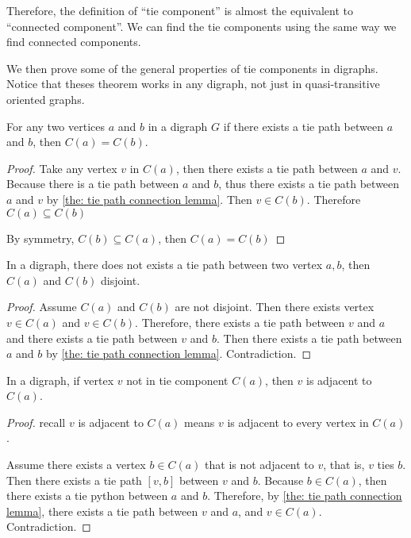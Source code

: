 Therefore, the definition of ``tie component''
is almost the equivalent to ``connected component''.
We can find the tie components using the same way
we find connected components.

We then prove some of the general properties of tie components
in digraphs.
Notice that theses theorem works in any digraph,
not just in quasi-transitive oriented graphs.

\begin{lemma}\label{the: component equal if tie path}
  For any two vertices \(a\) and \(b\) in a digraph \(G\)
  if there exists a tie path between \(a\) and \(b\),
  then \(C(a) = C(b)\).
\end{lemma}

\begin{proof}
  Take any vertex \(v\) in \(C(a)\),
  then there exists a tie path between \(a\) and \(v\).
  Because there is a tie path between \(a\) and \(b\),
  thus there exists a tie path between \(a\) and \(v\)
  by \cref{the: tie path connection lemma}.
  Then \(v \in C(b)\). Therefore \(C(a) \subseteq C(b)\)

  By symmetry, \(C(b) \subseteq C(a)\), then \(C(a) = C(b)\)
\end{proof}

\begin{lemma}\label{the: component disjoint if no tie path}
  In a digraph, there does not exists a tie path between
  two vertex \(a, b\), then \(C(a)\) and \(C(b)\) disjoint.
\end{lemma}
\begin{proof}
  Assume \(C(a)\) and \(C(b)\) are not disjoint.
  Then there exists vertex \(v \in C(a)\) and \(v \in C(b)\).
  Therefore, there exists a tie path between \(v\) and \(a\)
  and there exists a tie path between \(v\) and \(b\).
  Then there exists a tie path between \(a\) and \(b\)
  by \cref{the: tie path connection lemma}.
  Contradiction.
\end{proof}

\begin{lemma}\label{the: adjacent if not in component}
  In a digraph, if vertex \(v\) not in tie component \(C(a)\),
  then \(v\) is adjacent to \(C(a)\).
\end{lemma}
\begin{proof}
  recall \(v\) is adjacent to \(C(a)\)
  means \(v\) is adjacent to every vertex in \(C(a)\).

  Assume there exists a vertex \(b \in C(a)\)
  that is not adjacent to \(v\),
  that is, \(v\) ties \(b\).
  Then there exists a tie path \([v, b]\) between \(v\) and \(b\).
  Because \(b \in C(a)\),
  then there exists a tie python between \(a\) and \(b\).
  Therefore, by \cref{the: tie path connection lemma},
  there exists a tie path between \(v\) and \(a\),
  and \(v \in C(a)\).
  Contradiction.
\end{proof}


